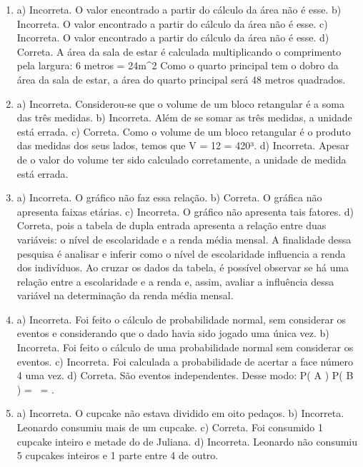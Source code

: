 \begin{enumerate}
\item a) Incorreta. O valor encontrado a partir do cálculo da área não é esse.
b) Incorreta. O valor encontrado a partir do cálculo da área não é esse.
c) Incorreta. O valor encontrado a partir do cálculo da área não é
esse.
d) Correta. A área da sala de estar é calculada multiplicando o comprimento pela largura:
{6 \; metros}  = 24\;m^2 Como o quarto principal
tem o dobro da área da sala de estar, a área do quarto principal será 48 metros quadrados.

\item a) Incorreta. Considerou-se que o volume de um bloco retangular é a soma das três medidas.
b) Incorreta. Além de se somar as três medidas, a unidade está errada.
c) Correta. Como o volume de um bloco retangular é o produto das medidas dos seus lados, temos que
V = 12   = 420³.
d) Incorreta. Apesar de o valor do volume ter sido calculado corretamente, a unidade de medida está errada.

\item a) Incorreta. O gráfico não faz essa relação.
b) Correta. O gráfica não apresenta faixas etárias.
c) Incorreta. O gráfico não apresenta tais fatores.
d) Correta, pois a tabela de dupla entrada apresenta a relação entre duas variáveis: o nível de escolaridade e a renda média mensal. A finalidade dessa pesquisa é analisar e inferir como o nível de escolaridade influencia a renda dos indivíduos. Ao cruzar os dados da
tabela, é possível observar se há uma relação entre a escolaridade e a renda e, assim, avaliar a influência dessa variável na determinação da renda média mensal.

\item a) Incorreta. Foi feito o cálculo de probabilidade normal, sem considerar os eventos e considerando que o dado havia sido jogado uma
única vez.
b) Incorreta. Foi feito o cálculo de uma probabilidade normal sem considerar os eventos.
c) Incorreta. Foi calculada a probabilidade de acertar a face número 4 uma vez.
d) Correta. São eventos independentes. Desse modo:
P\left( A \right) \times P\left( B \right) =  \times {}\  = .

\item a) Incorreta. O cupcake não estava dividido em oito pedaços.
b) Incorreta. Leonardo consumiu mais de um cupcake.
c) Correta. Foi consumido 1 cupcake inteiro e metade do de Juliana.
d) Incorreta. Leonardo não consumiu 5 cupcakes inteiros e 1 parte entre 4 de outro.
\end{enumerate}

